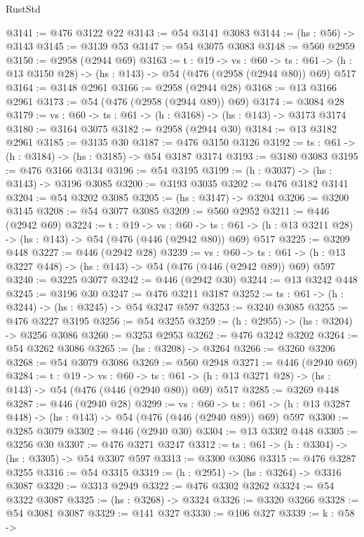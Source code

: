 \begin{lexlean}{RustStd}
\begin{coremodule}
@3141 := @476 @3122 @22
@3143 := @54 @3141 @3083
@3144 := (hs : @56) -> @3143
@3145 := @3139 @53
@3147 := @54 @3075 @3083
@3148 := @560 @2959
@3150 := @2958 (@2944 @69)
@3163 := {t : @19} ->
  {vs : @60} ->
  {ts : @61} -> (h : @13 @3150 @28) -> (hs : @143) -> @54 (@476 (@2958 (@2944 @80)) @69) @517
@3164 := @3148 @2961
@3166 := @2958 (@2944 @28)
@3168 := @13 @3166 @2961
@3173 := @54 (@476 (@2958 (@2944 @89)) @69)
@3174 := @3084 @28
@3179 := {vs : @60} -> {ts : @61} -> (h : @3168) -> (hs : @143) -> @3173 @3174
@3180 := @3164 @3075
@3182 := @2958 (@2944 @30)
@3184 := @13 @3182 @2961
@3185 := @3135 @30
@3187 := @476 @3150 @3126
@3192 := {ts : @61} -> (h : @3184) -> (hs : @3185) -> @54 @3187 @3174
@3193 := @3180 @3083
@3195 := @476 @3166 @3134
@3196 := @54 @3195
@3199 := (h : @3037) -> (hs : @3143) -> @3196 @3085
@3200 := @3193 @3035
@3202 := @476 @3182 @3141
@3204 := @54 @3202 @3085
@3205 := (hs : @3147) -> @3204
@3206 := @3200 @3145
@3208 := @54 @3077 @3085
@3209 := @560 @2952
@3211 := @446 (@2942 @69)
@3224 := {t : @19} ->
  {vs : @60} ->
  {ts : @61} -> (h : @13 @3211 @28) -> (hs : @143) -> @54 (@476 (@446 (@2942 @80)) @69) @517
@3225 := @3209 @448
@3227 := @446 (@2942 @28)
@3239 := {vs : @60} ->
  {ts : @61} -> (h : @13 @3227 @448) -> (hs : @143) -> @54 (@476 (@446 (@2942 @89)) @69) @597
@3240 := @3225 @3077
@3242 := @446 (@2942 @30)
@3244 := @13 @3242 @448
@3245 := @3196 @30
@3247 := @476 @3211 @3187
@3252 := {ts : @61} -> (h : @3244) -> (hs : @3245) -> @54 @3247 @597
@3253 := @3240 @3085
@3255 := @476 @3227 @3195
@3256 := @54 @3255
@3259 := (h : @2955) -> (hs : @3204) -> @3256 @3086
@3260 := @3253 @2953
@3262 := @476 @3242 @3202
@3264 := @54 @3262 @3086
@3265 := (hs : @3208) -> @3264
@3266 := @3260 @3206
@3268 := @54 @3079 @3086
@3269 := @560 @2948
@3271 := @446 (@2940 @69)
@3284 := {t : @19} ->
  {vs : @60} ->
  {ts : @61} -> (h : @13 @3271 @28) -> (hs : @143) -> @54 (@476 (@446 (@2940 @80)) @69) @517
@3285 := @3269 @448
@3287 := @446 (@2940 @28)
@3299 := {vs : @60} ->
  {ts : @61} -> (h : @13 @3287 @448) -> (hs : @143) -> @54 (@476 (@446 (@2940 @89)) @69) @597
@3300 := @3285 @3079
@3302 := @446 (@2940 @30)
@3304 := @13 @3302 @448
@3305 := @3256 @30
@3307 := @476 @3271 @3247
@3312 := {ts : @61} -> (h : @3304) -> (hs : @3305) -> @54 @3307 @597
@3313 := @3300 @3086
@3315 := @476 @3287 @3255
@3316 := @54 @3315
@3319 := (h : @2951) -> (hs : @3264) -> @3316 @3087
@3320 := @3313 @2949
@3322 := @476 @3302 @3262
@3324 := @54 @3322 @3087
@3325 := (hs : @3268) -> @3324
@3326 := @3320 @3266
@3328 := @54 @3081 @3087
@3329 := @141 @327
@3330 := @106 @327
@3339 := {k : @58} ->

\end{coremodule}
\end{lexlean}
